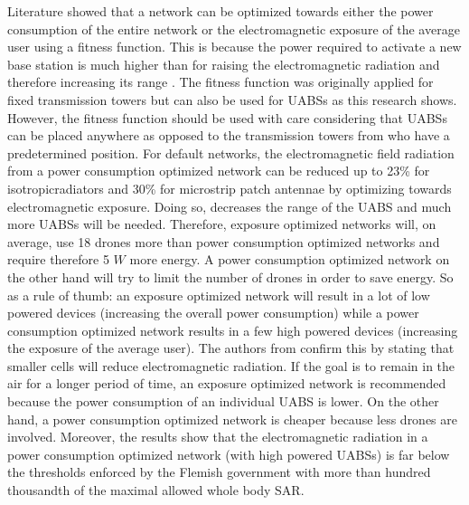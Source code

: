 Literature showed that a network can be optimized towards either the power consumption of the entire network 
or the electromagnetic exposure of the average user using a fitness function. This is because the power required to activate a new 
base station is much higher than for raising the electromagnetic radiation and therefore increasing its range \cite{J1}.
The fitness function was originally applied for fixed transmission towers but can also be used 
for \gls{UABS}s as this research shows.
However, the fitness function should be used with care considering that \gls{UABS}s can be placed anywhere as opposed to 
the transmission towers from \cite{J1} who have a predetermined position.  
For default networks, the electromagnetic field radiation from a
power consumption optimized network can be reduced up to 23\% for \gls{isotropicradiator}s and 30\% for microstrip patch antennae 
by optimizing towards electromagnetic exposure. Doing so, decreases the range of the \gls{UABS} and much more \gls{UABS}s will be needed. 
Therefore, exposure optimized networks will, on average, use 18 drones more than power consumption optimized networks
and require therefore 5 $W$ more energy.
A power consumption optimized network on the other hand will try to limit the number of drones 
in order to save energy.
 So as a rule of thumb: an exposure optimized network will result in a lot of low powered devices (increasing the overall power consumption)
while a power consumption optimized network results in a few high powered devices (increasing the exposure of the average user).
The authors from \cite{J17_kuehn2019modelling} confirm this by stating that smaller cells will reduce electromagnetic radiation. 
If the goal is to remain in the air for a longer period of time, an exposure optimized network is recommended because the power consumption of 
an individual \gls{UABS} is lower.
On the other hand, a power consumption optimized network is cheaper because less drones are involved.
Moreover, the results show that the electromagnetic radiation in a power consumption optimized network (with high powered \gls{UABS}s)
is far below the thresholds enforced by the Flemish government with more than hundred thousandth of the maximal allowed whole body \gls{SAR}.


